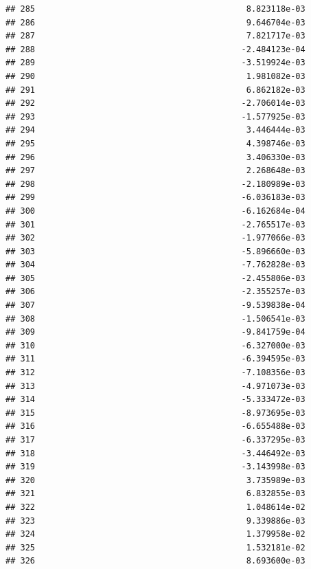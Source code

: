 \documentclass[
]{article}
\begin{document}
\begin{verbatim}
## 285                                           8.823118e-03
## 286                                           9.646704e-03
## 287                                           7.821717e-03
## 288                                          -2.484123e-04
## 289                                          -3.519924e-03
## 290                                           1.981082e-03
## 291                                           6.862182e-03
## 292                                          -2.706014e-03
## 293                                          -1.577925e-03
## 294                                           3.446444e-03
## 295                                           4.398746e-03
## 296                                           3.406330e-03
## 297                                           2.268648e-03
## 298                                          -2.180989e-03
## 299                                          -6.036183e-03
## 300                                          -6.162684e-04
## 301                                          -2.765517e-03
## 302                                          -1.977066e-03
## 303                                          -5.896660e-03
## 304                                          -7.762828e-03
## 305                                          -2.455806e-03
## 306                                          -2.355257e-03
## 307                                          -9.539838e-04
## 308                                          -1.506541e-03
## 309                                          -9.841759e-04
## 310                                          -6.327000e-03
## 311                                          -6.394595e-03
## 312                                          -7.108356e-03
## 313                                          -4.971073e-03
## 314                                          -5.333472e-03
## 315                                          -8.973695e-03
## 316                                          -6.655488e-03
## 317                                          -6.337295e-03
## 318                                          -3.446492e-03
## 319                                          -3.143998e-03
## 320                                           3.735989e-03
## 321                                           6.832855e-03
## 322                                           1.048614e-02
## 323                                           9.339886e-03
## 324                                           1.379958e-02
## 325                                           1.532181e-02
## 326                                           8.693600e-03

\end{verbatim}
\end{document}
